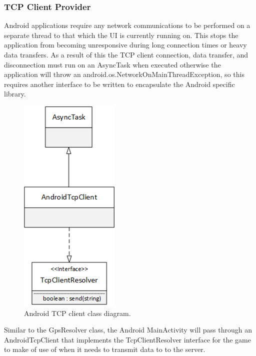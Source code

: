 \subsubsection{TCP Client Provider}
Android applications require any network communications to be performed on a separate thread to that which the UI is currently running on. This stops the application from becoming unresponsive during long connection times or heavy data transfers. As a result of this the TCP client connection, data transfer, and disconnection must run on an AsyncTask when executed otherwise the application will throw an android.os.NetworkOnMainThreadException, so this requires another interface to be written to encapsulate the Android specific library. 
\clearpage
\begin{figure}[h!]
\centering\includegraphics{design/figures/tcp-cd.png}
\caption{Android TCP client class diagram.}
\end{figure}

Similar to the GpsResolver class, the Android MainActivity will pass through an AndroidTcpClient that implements the TcpClientResolver interface for the game to make of use of when it needs to transmit data to to the server.

